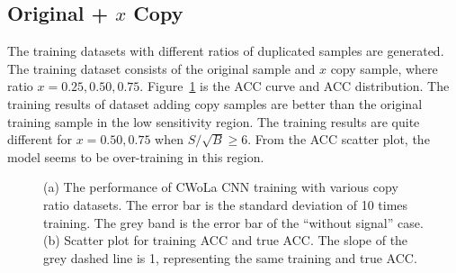 \documentclass[12pt]{article}
\begin{document}
	\subsection{Original + $x$ Copy}%
	\label{sub:original_x_copy}
		The training datasets with different ratios of duplicated samples are generated. The training dataset consists of the original sample and $x$ copy sample, where ratio $x=0.25, 0.50, 0.75$. Figure~\ref{fig:cwola_cnn_training_performance_copy_ratio} is the ACC curve and ACC distribution. The training results of dataset adding copy samples are better than the original training sample in the low sensitivity region. The training results are quite different for $x = 0.50, 0.75$ when $S / \sqrt{B} \ge 6$. From the ACC scatter plot, the model seems to be over-training in this region.
		\begin{figure}[htpb]
			\centering
			\caption{(a) The performance of CWoLa CNN training with various copy ratio datasets. The error bar is the standard deviation of 10 times training. The grey band is the error bar of the ``without signal'' case. (b) Scatter plot for training ACC and true ACC. The slope of the grey dashed line is 1, representing the same training and true ACC.}
			\label{fig:cwola_cnn_training_performance_copy_ratio}
		\end{figure}
\end{document}
